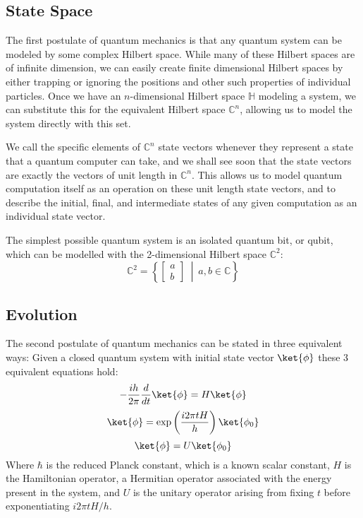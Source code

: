 \subsection{State Space}
The first postulate of quantum mechanics is that any quantum system can be modeled by some complex Hilbert space. While many of these Hilbert spaces are of infinite dimension, we can easily create finite dimensional Hilbert spaces by either trapping or ignoring the positions and other such properties of individual particles. Once we have an $n$-dimensional Hilbert space $\mathbb{H}$ modeling a system, we can substitute this for the equivalent Hilbert space $\mathbb{C}^n$, allowing us to model the system directly with this set.

We call the specific elements of $\mathbb{C}^n$ state vectors whenever they represent a state that a quantum computer can take, and we shall see soon that the state vectors are exactly the vectors of unit length in $\mathbb{C}^n$. This allows us to model quantum computation itself as an operation on these unit length state vectors, and to describe the initial, final, and intermediate states of any given computation as an individual state vector.

The simplest possible quantum system is an isolated quantum bit, or qubit, which can be modelled with the 2-dimensional Hilbert space $\mathbb{C}^2$:
\[
\mathbb{C}^2 = \left\{\left[\begin{matrix}
a\\
b
\end{matrix}\right]\ \middle|\ a, b \in \mathbb{C}\right\}
\]
\subsection{Evolution}
The second postulate of quantum mechanics can be stated in three equivalent ways: Given a closed quantum system with initial state vector $\ket{\phi}$ these 3 equivalent equations hold:
\[-\frac{ih}{2\pi}\frac{d}{dt}\ket{\phi} = H\ket{\phi}\]
\[\ket{\phi} = \exp\left(\frac{i 2\pi tH}{h}\right)\ket{\phi_0}\]
\[\ket{\phi} = U\ket{\phi_0}\]
Where $\hbar$ is the reduced Planck constant, which is a known scalar constant, $H$ is the Hamiltonian operator, a Hermitian operator associated with the energy present in the system, and $U$ is the unitary operator arising from fixing $t$ before exponentiating $i2\pi tH/h$.

